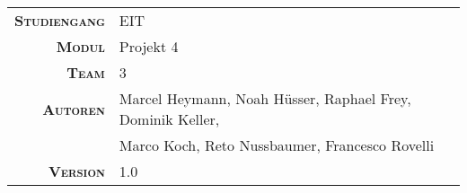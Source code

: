 \begin{titlepage}

    \maketitle

    \vspace{60mm}

    \begin{tabular}{r|l}

        \textsc{\textbf{Studiengang}}
        & EIT\\
        [4mm]

        \textsc{\textbf{Modul}}
        & Projekt 4 \\
        [4mm]

        \textsc{\textbf{Team}}
        & 3 \\
        [4mm]

        \textsc{\textbf{Autoren}}
        & Marcel Heymann, Noah H\"usser, Raphael Frey, Dominik Keller,  \\
        & Marco Koch, Reto Nussbaumer, Francesco Rovelli                \\
        [4mm]

        \textsc{\textbf{Version}}
        & 1.0 \\
    \end{tabular}

\end{titlepage}
